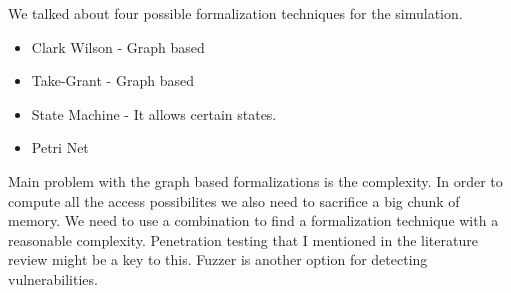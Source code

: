 \documentclass[11pt]{article} %
\begin{document}
We talked about four possible formalization techniques for the simulation.

\begin{itemize}
\item Clark Wilson - Graph based
\item Take-Grant - Graph based
\item State Machine - It allows certain states.
\item Petri Net
\end{itemize}

Main problem with the graph based formalizations is the complexity.
In order to compute all the access possibilites we also need to sacrifice a big chunk of memory.
We need to use a combination to find a formalization technique with a reasonable complexity.
Penetration testing that I mentioned in the literature review might be a key to this.
Fuzzer is another option for detecting vulnerabilities.
\end{document}
